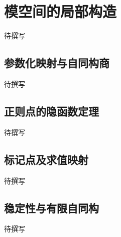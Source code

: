 
% 
% 

\section{模空间的局部构造}
\label{g4:sec:2301}

待撰写

\subsection{参数化映射与自同构商}
\label{g4:subsec:2301:01}
待撰写

\subsection{正则点的隐函数定理}
\label{g4:subsec:2301:02}
待撰写

\subsection{标记点及求值映射}
\label{g4:subsec:2301:03}
待撰写

\subsection{稳定性与有限自同构}
\label{g4:subsec:2301:04}
待撰写

